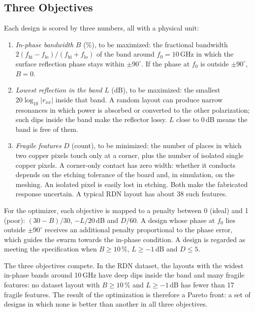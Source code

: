 \documentclass[journal]{IEEEtran}
\begin{document}
\subsection{Three Objectives}
Each design is scored by three numbers, all with a physical unit:
\begin{enumerate}
\item \emph{In-phase bandwidth} $B$ (\%), to be maximized: the fractional bandwidth $2(f_{\mathrm{hi}}-f_{\mathrm{lo}})/(f_{\mathrm{hi}}+f_{\mathrm{lo}})$ of the band around $f_0=10$\,GHz in which the surface reflection phase stays within $\pm90^\circ$. If the phase at $f_0$ is outside $\pm90^\circ$, $B=0$.
\item \emph{Lowest reflection in the band} $L$ (dB), to be maximized: the smallest $20\log_{10}|r_{xx}|$ inside that band. A random layout can produce narrow resonances in which power is absorbed or converted to the other polarization; such dips inside the band make the reflector lossy. $L$ close to 0\,dB means the band is free of them.
\item \emph{Fragile features} $D$ (count), to be minimized: the number of places in which two copper pixels touch only at a corner, plus the number of isolated single copper pixels. A corner-only contact has zero width: whether it conducts depends on the etching tolerance of the board and, in simulation, on the meshing. An isolated pixel is easily lost in etching. Both make the fabricated response uncertain. A typical RDN layout has about 38 such features.
\end{enumerate}
For the optimizer, each objective is mapped to a penalty between 0 (ideal) and 1 (poor): $(30-B)/30$, $-L/20$\,dB and $D/60$. A design whose phase at $f_0$ lies outside $\pm90^\circ$ receives an additional penalty proportional to the phase error, which guides the swarm towards the in-phase condition. A design is regarded as meeting the specification when $B\geq10\,\%$, $L\geq-1$\,dB and $D\leq5$.

The three objectives compete. In the RDN dataset, the layouts with the widest in-phase bands around 10\,GHz have deep dips inside the band and many fragile features: no dataset layout with $B\geq10\,\%$ and $L\geq-1$\,dB has fewer than 17 fragile features. The result of the optimization is therefore a Pareto front: a set of designs in which none is better than another in all three objectives.
\end{document}
